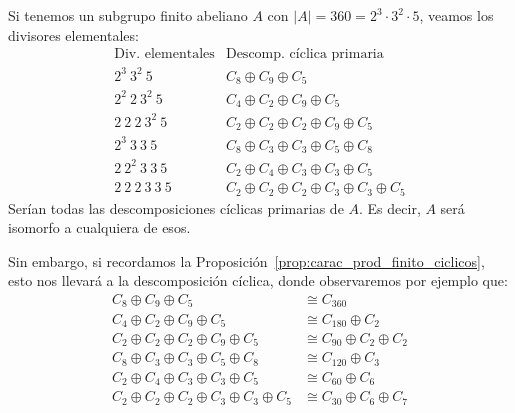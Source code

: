 \begin{ejemplo}
    Si tenemos un subgrupo finito abeliano $A$ con $|A| = 360 = 2^3\cdot 3^2\cdot 5$, veamos los divisores elementales:
    \begin{equation*}
        \begin{array}{r|l}
            \text{Div. elementales} & \text{Descomp. cíclica primaria} \\
            \hline
            2^3\ 3^2\ 5 & C_8\oplus C_9 \oplus C_5 \\
            2^2\ 2\ 3^2\ 5 & C_4\oplus C_2 \oplus C_9 \oplus C_5\\
            2\ 2\ 2\ 3^2\ 5 & C_2 \oplus C_2 \oplus C_2 \oplus C_9 \oplus C_5\\
            2^3\ 3\ 3\ 5 & C_8\oplus C_3 \oplus C_3 \oplus C_5 \oplus C_8\\
            2\ 2^2\ 3\ 3\ 5 & C_2 \oplus C_4 \oplus C_3 \oplus C_3 \oplus C_5\\
            2\ 2\ 2\ 3\ 3\ 5 & C_2 \oplus C_2 \oplus C_2 \oplus C_3 \oplus C_3 \oplus C_5
        \end{array}
    \end{equation*}
    Serían todas las descomposiciones cíclicas primarias de $A$. Es decir, $A$ será isomorfo a cualquiera de esos.
\end{ejemplo}

\noindent
Sin embargo, si recordamos la Proposición~\ref{prop:carac_prod_finito_ciclicos}, esto nos llevará a la descomposición cíclica, donde observaremos por ejemplo que:
\begin{align*}
    C_8\oplus C_9 \oplus C_5 &\cong C_{360} \\
    C_4\oplus C_2 \oplus C_9 \oplus C_5 &\cong C_{180} \oplus C_2 \\
    C_2 \oplus C_2 \oplus C_2 \oplus C_9 \oplus C_5 &\cong C_{90} \oplus C_2 \oplus C_2 \\
    C_8\oplus C_3 \oplus C_3 \oplus C_5 \oplus C_8 &\cong C_{120} \oplus C_3 \\
    C_2 \oplus C_4 \oplus C_3 \oplus C_3 \oplus C_5 &\cong C_{60} \oplus C_6 \\
    C_2 \oplus C_2 \oplus C_2 \oplus C_3 \oplus C_3 \oplus C_5 &\cong C_{30} \oplus C_6 \oplus C_7
\end{align*}
